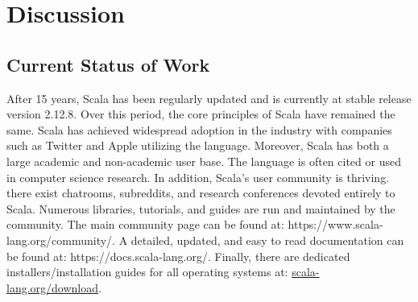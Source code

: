 \documentclass[jou,apacite]{IEEEtran}
\begin{document}
\section{Discussion}
\label{sec:discussion}

\subsection{Current Status of Work}
After 15 years, Scala has been regularly updated and is currently at stable
release version 2.12.8. Over this period, the core principles of Scala have
remained the same. Scala has achieved widespread adoption in the industry with
companies such as Twitter and Apple utilizing the language. Moreover, Scala has
both a large academic and non-academic user base. The language is often cited or
used in computer science research. In addition, Scala's user community is
thriving. there exist chatrooms, subreddits, and research conferences devoted
entirely to Scala. Numerous libraries, tutorials, and guides are run and
maintained by the community. The main community page can be found at:
https://www.scala-lang.org/community/. A detailed, updated, and easy to read
documentation can be found at: https://docs.scala-lang.org/. Finally, there are
dedicated installers/installation guides for all operating systems at:
\href{https://www.scala-lang.org/download/}{scala-lang.org/download}.




\end{document}
